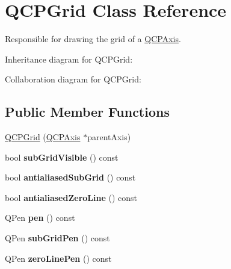 \hypertarget{classQCPGrid}{}\section{Q\+C\+P\+Grid Class Reference}
\label{classQCPGrid}


Responsible for drawing the grid of a \hyperlink{classQCPAxis}{Q\+C\+P\+Axis}.  




Inheritance diagram for Q\+C\+P\+Grid\+:


Collaboration diagram for Q\+C\+P\+Grid\+:
\subsection*{Public Member Functions}
\begin{DoxyCompactItemize}
\item 
\hyperlink{classQCPGrid_acd1cdd2909625388a13048b698494a17}{Q\+C\+P\+Grid} (\hyperlink{classQCPAxis}{Q\+C\+P\+Axis} $\ast$parent\+Axis)
\item 
bool {\bfseries sub\+Grid\+Visible} () const \hypertarget{classQCPGrid_a0a8963e384d53cd77cbab7df96147458}{}\label{classQCPGrid_a0a8963e384d53cd77cbab7df96147458}

\item 
bool {\bfseries antialiased\+Sub\+Grid} () const \hypertarget{classQCPGrid_abfa6c638a05b45b2ed31b680fc9b31fc}{}\label{classQCPGrid_abfa6c638a05b45b2ed31b680fc9b31fc}

\item 
bool {\bfseries antialiased\+Zero\+Line} () const \hypertarget{classQCPGrid_a4dfbc1cee989d8cae1434b765ab2a13b}{}\label{classQCPGrid_a4dfbc1cee989d8cae1434b765ab2a13b}

\item 
Q\+Pen {\bfseries pen} () const \hypertarget{classQCPGrid_aca20b67548e3ae31fd02e6398ffd6cb9}{}\label{classQCPGrid_aca20b67548e3ae31fd02e6398ffd6cb9}

\item 
Q\+Pen {\bfseries sub\+Grid\+Pen} () const \hypertarget{classQCPGrid_ac698f8c6864b1d8f0e2af97ca4b39cc6}{}\label{classQCPGrid_ac698f8c6864b1d8f0e2af97ca4b39cc6}

\item 
Q\+Pen {\bfseries zero\+Line\+Pen} () const \hypertarget{classQCPGrid_a06ea986b651860446e1224d2097259b9}{}\label{classQCPGrid_a06ea986b651860446e1224d2097259b9}


\end{DoxyCompactItemize}
